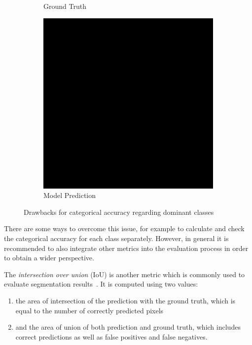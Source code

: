 \begin{figure}
\begin{subfigure}{\CategoricalAccuracyImageWidth}
        \caption{Ground Truth}
        \label{fig:ca_truth}
    \end{subfigure}
    \hfill
    \begin{subfigure}{\CategoricalAccuracyImageWidth}
        \includegraphics[width=\textwidth]{images/categorical_accuracy_prediction}
        \caption{Model Prediction}
        \label{fig:ca_prediction}
    \end{subfigure}
    \hfill
    \caption{Drawbacks for categorical accuracy regarding dominant classes~\cite{tds_segmentation18}}
    \label{fig:categorical_accuracy_drawbacks}
\end{figure}

There are some ways to overcome this issue, for example to calculate and check the categorical accuracy for each class separately. However, in general it is recommended to also integrate other metrics into the evaluation process in order to obtain a wider perspective.

The \emph{intersection over union} (IoU) is another metric which is commonly used to evaluate segmentation results~\cite{pascal_voc15}. It is computed using two values:
\begin{enumerate}
    \item the area of intersection of the prediction with the ground truth, which is equal to the number of correctly predicted pixels
    \item and the area of union of both prediction and ground truth, which includes correct predictions as well as false positives and false negatives.
\end{enumerate}


